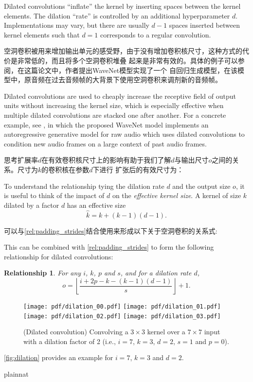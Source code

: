 \documentclass[notitlepage]{report}
\newtheorem{relationship}{Relationship}
\begin{document}
Dilated convolutions ``inflate'' the kernel by inserting spaces between the
kernel elements. The dilation ``rate'' is controlled by an additional
hyperparameter $d$. Implementations may vary, but there are usually $d - 1$
spaces inserted between kernel elements such that $d = 1$ corresponds to a
regular convolution.

空洞卷积被用来增加输出单元的感受野，由于没有增加卷积核尺寸，这种方式的代价是非常低的，而且将多个空洞卷积堆叠
起来是非常有效的。具体的例子可以参阅\citet{oord2016wavenet}，在这篇论文中，作者提出WaveNet模型实现了一个
自回归生成模型，在该模型中，原音频在过去音频帧的大背景下使用空洞卷积来调剂新的音频帧。

Dilated convolutions are used to cheaply increase the receptive field of output
units without increasing the kernel size, which is especially effective
when multiple dilated convolutions are stacked one after another. For a
concrete example, see \citet{oord2016wavenet}, in which the proposed WaveNet
model implements an autoregressive generative model for raw audio which uses
dilated convolutions to condition new audio frames on a large context of past
audio frames.

思考扩展率$d$在有效卷积核尺寸上的影响有助于我们了解$d$与输出尺寸$o$之间的关系。尺寸为$k$的卷积核在参数$d$下进行
扩张后的有效尺寸为：

To understand the relationship tying the dilation rate $d$ and the output size
$o$, it is useful to think of the impact of $d$ on the {\em effective kernel
size}. A kernel of size $k$ dilated by a factor $d$ has an effective size
\begin{equation*}
    \hat{k} = k + (k - 1)(d - 1).
\end{equation*}

可以与\autoref{rel:padding_strides}结合使用来形成以下关于空洞卷积的关系式:

This can be combined with \autoref{rel:padding_strides} to form the following
relationship for dilated convolutions:

\begin{relationship}\label{rel:dilation}
For any $i$, $k$, $p$ and $s$, and for a dilation rate $d$,
\begin{equation*}
    o = \left\lfloor \frac{i + 2p - k - (k - 1)(d - 1)}{s} \right\rfloor + 1.
\end{equation*}
\end{relationship}

\begin{figure}[h]
    \centering
    \texttt{[image: pdf/dilation\_00.pdf]}
    \texttt{[image: pdf/dilation\_01.pdf]}
    \texttt{[image: pdf/dilation\_02.pdf]}
    \texttt{[image: pdf/dilation\_03.pdf]}
    \caption{\label{fig:dilation} (Dilated convolution)
        Convolving a $3 \times 3$ kernel over a $7 \times 7$ input with a
        dilation factor of 2 (i.e., $i = 7$, $k = 3$, $d = 2$, $s = 1$ and
        $p = 0$).}
\end{figure}

\noindent \autoref{fig:dilation} provides an example for $i = 7$, $k = 3$ and
$d = 2$.


%
 {plainnat}
\end{document}
